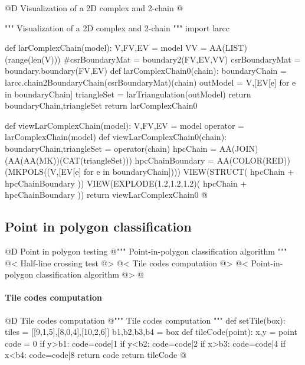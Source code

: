 \documentclass[11pt,oneside]{article}    %
\begin{document}
@D Visualization of a 2D complex and 2-chain
@{""" Visualization of a 2D complex and 2-chain """
import larcc

def larComplexChain(model):
    V,FV,EV = model
    VV = AA(LIST)(range(len(V)))
    #csrBoundaryMat = boundary2(FV,EV,VV)
    csrBoundaryMat = boundary.boundary(FV,EV)
    def larComplexChain0(chain):
        boundaryChain = larcc.chain2BoundaryChain(csrBoundaryMat)(chain)
        outModel = V,[EV[e] for e in boundaryChain]
        triangleSet = larTriangulation(outModel)
        return boundaryChain,triangleSet
    return larComplexChain0
    
def viewLarComplexChain(model):
    V,FV,EV = model
    operator = larComplexChain(model)
    def viewLarComplexChain0(chain):
        boundaryChain,triangleSet = operator(chain)
        hpcChain = AA(JOIN)(AA(AA(MK))(CAT(triangleSet)))
        hpcChainBoundary = AA(COLOR(RED))(MKPOLS((V,[EV[e] for e in boundaryChain])))
        VIEW(STRUCT( hpcChain + hpcChainBoundary ))
        VIEW(EXPLODE(1.2,1.2,1.2)( hpcChain + hpcChainBoundary ))
    return viewLarComplexChain0
@}




\subsection{Point in polygon classification}


@D Point in polygon testing
@{""" Point-in-polygon classification algorithm """
@< Half-line crossing test @>
@< Tile codes computation @>
@< Point-in-polygon classification algorithm @>
@}

\paragraph{Tile codes computation}
@D Tile codes computation
@{""" Tile codes computation """
def setTile(box):
    tiles = [[9,1,5],[8,0,4],[10,2,6]]
    b1,b2,b3,b4 = box
    def tileCode(point):
        x,y = point
        code = 0
        if y>b1: code=code|1
        if y<b2: code=code|2
        if x>b3: code=code|4
        if x<b4: code=code|8
        return code 
    return tileCode
@}
\end{document}
